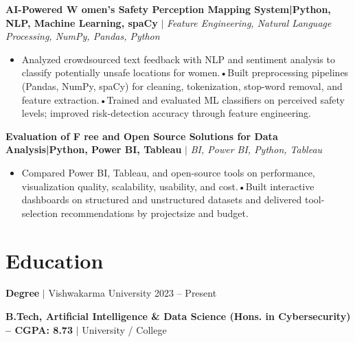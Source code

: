 \documentclass[10pt,letterpaper]{article}
\begin{document}
\noindent \textbf{AI-Powered W omen’s Safety Perception Mapping System|Python, NLP, Machine Learning, spaCy} $|$ \textit{Feature Engineering, Natural Language Processing, NumPy, Pandas, Python} 

\begin{itemize}
    
    \item Analyzed crowdsourced text feedback with NLP and sentiment analysis to classify potentially unsafe locations for women.•Built preprocessing pipelines (Pandas, NumPy, spaCy) for cleaning, tokenization, stop-word removal, and feature extraction.•Trained and evaluated ML classifiers on perceived safety levels; improved risk-detection accuracy through feature engineering.
    
\end{itemize}
\vspace{3pt}

\noindent \textbf{Evaluation of F ree and Open Source Solutions for Data Analysis|Python, Power BI, Tableau} $|$ \textit{BI, Power BI, Python, Tableau} 

\begin{itemize}
    
    \item Compared Power BI, Tableau, and open-source tools on performance, visualization quality, scalability, usability, and cost.•Built interactive dashboards on structured and unstructured datasets and delivered tool-selection recommendations by projectsize and budget.
    
\end{itemize}
\vspace{3pt}




\section{Education}

\noindent \textbf{Degree} $|$ Vishwakarma University 2023 – Present \hfill  \\


\vspace{2pt}

\noindent \textbf{B.Tech, Artificial Intelligence \& Data Science (Hons. in Cybersecurity) – CGPA: 8.73} $|$ University / College \hfill  \\


\vspace{2pt}
\end{document}
